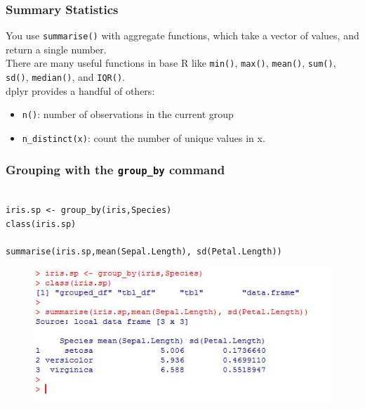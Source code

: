 \documentclass{beamer}
\begin{document}
\begin{frame}
\frametitle{Summary Statistics}
You use \texttt{summarise()} with aggregate functions, which take a vector of values, and return a single number.\\ \bigskip There are many useful functions in base R like \texttt{min()}, \texttt{max()}, \texttt{mean()}, \texttt{sum()}, \texttt{sd()}, \texttt{median()}, and \texttt{IQR()}.\\ \bigskip dplyr provides a handful of others:
\begin{itemize}
\item 
\texttt{n()}: number of observations in the current group
\item 
\texttt{n\_distinct(x)}: count the number of unique values in x.
\end{itemize}

%
\end{frame}
\begin{frame}[fragile]
\frametitle{Grouping with the \texttt{group\_by} command}
\begin{verbatim}
	
iris.sp <- group_by(iris,Species)
class(iris.sp)
		
summarise(iris.sp,mean(Sepal.Length), sd(Petal.Length))

\end{verbatim}
\end{frame}
\begin{frame}
\begin{figure}
\centering
\includegraphics[width=1.05\linewidth]{irisgroupby}
\end{figure}
\end{frame}	
\end{document}

